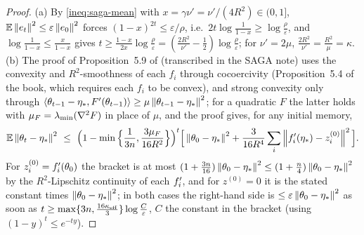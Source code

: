 \begin{proof}
(a) By \eqref{ineq:saga-mean} with $x=\gamma\nu'=\nu'/(4R^2)\in(0,1]$, $\mathbb{E}\left\|e_t\right\|^2\le\varepsilon\left\|e_0\right\|^2$ forces $(1-x)^{2t}\le\varepsilon/\rho$, i.e.\ $2t\log\frac1{1-x}\ge\log\frac\rho\varepsilon$, and $\log\frac1{1-x}\le\frac x{1-x}$ gives $t\ge\frac{1-x}{2x}\log\frac\rho\varepsilon=(\frac{2R^2}{\nu'}-\frac12)\log\frac\rho\varepsilon$; for $\nu'=2\mu$, $\frac{2R^2}{\nu'}=\frac{R^2}\mu=\kappa$. (b) The proof of Proposition~5.9 of \cite{bach2024learning} (transcribed in the SAGA note) uses the convexity and $R^2$-smoothness of each $f_i$ through cocoercivity (Proposition~5.4 of the book, which requires each $f_i$ to be convex), and strong convexity only through $\left\langle \theta_{t-1}-\eta_\ast, F'(\theta_{t-1}) \right\rangle\ge\mu\left\|\theta_{t-1}-\eta_\ast\right\|^2$; for a quadratic $F$ the latter holds with $\mu_F=\lambda_{\min}(\nabla^2F)$ in place of $\mu$, and the proof gives, for any initial memory,
\[
\E\norm{\theta_t-\etastar}^2\ \le\ \Big(1-\min\Big\{\frac1{3n},\frac{3\mu_F}{16R^2}\Big\}\Big)^t\Big[\norm{\theta_0-\etastar}^2+\frac3{16R^4}\sum_i\norm{\fip(\etastar)-z_i^{(0)}}^2\Big].
\]
For $z_i^{(0)}=f'_i(\theta_0)$ the bracket is at most $(1+\frac{3n}{16})\left\|\theta_0-\eta_\ast\right\|^2\le(1+\frac n4)\left\|\theta_0-\eta_\ast\right\|^2$ by the $R^2$-Lipschitz continuity of each $f'_i$, and for $z^{(0)}=0$ it is the stated constant times $\left\|\theta_0-\eta_\ast\right\|^2$; in both cases the right-hand side is $\le\varepsilon\left\|\theta_0-\eta_\ast\right\|^2$ as soon as $t\ge\max\{3n,\frac{16\kappa_{\rm eff}}3\}\log\frac{C}{\varepsilon}$, $C$ the constant in the bracket (using $(1-y)^t\le e^{-ty}$).
\end{proof}

